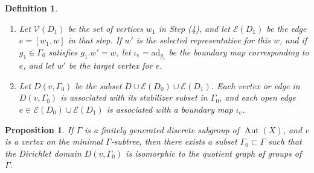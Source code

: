 \documentclass[12pt,leqno]{amsart}
\newcommand{\2}{L^2_{\rm per}(0, T)}
\newtheorem{prop}{Proposition}[section]
\newtheorem{defn}{Definition}[section]
\newcommand{\aut}{{\operatorname{Aut}}}
\numberwithin{equation}{section}
\numberwithin{figure}{section}
\begin{document}
\begin{defn}
\begin{enumerate}
        \item Let $\mathcal{V}(D_1)$ be the set of vertices $w_1$ in Step (4), and let $\mathcal{E}(D_1)$ be the edge $e = [w_1,w]$ in that step. If $w'$ is the selected representative for this $w$, and if $g_1\in\Gamma_0$ satisfies $g_1.w' = w$, let $\iota_e = \mathrm{ad}_{g_1}$ be the boundary map corresponding to $e$, and let $w'$ be the target vertex for $e$.
        \item Let $D(v,\Gamma_0)$ be the subset $D\cup \mathcal{E}(D_0)\cup \mathcal{E}(D_1)$. Each vertex or edge in $D(v,\Gamma_0)$ is associated with its stabilizer subset in $\Gamma_0$, and each open edge $e\in \mathcal{E}(D_0)\cup \mathcal{E}(D_1)$ is associated with a boundary map $\iota_e$.
    \end{enumerate}
\end{defn}
\begin{prop}
    If $\Gamma$ is a finitely generated discrete subgroup of $\aut(X)$, and $v$ is a vertex on the minimal $\Gamma$-subtree, then there exists a subset $\Gamma_0\subset \Gamma$ such that the Dirichlet domain $D(v,\Gamma_0)$ is isomorphic to the quotient graph of groups of $\Gamma$. 
\end{prop}
\end{document}
